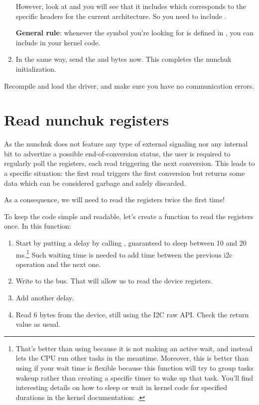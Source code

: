 \begin{enumerate}
      However, look at  and you will see
      that it includes  which corresponds to the
      specific headers for the current architecture. So you need to include
      .

      {\bf General rule}: whenever the symbol you're looking
      for is defined in , you
      can include  in your kernel code.

\item In the same way, send the  and  bytes now.
      This completes the nunchuk initialization.
\end{enumerate}

Recompile and load the driver, and make sure you have no communication
errors.

\section{Read nunchuk registers}

As the nunchuk does not feature any type of external signaling nor any
internal bit to advertize a possible end-of-conversion status, the user
is required to regularly poll the registers, each read triggering the
next conversion. This leads to a specific situation: the first read
triggers the first conversion but returns some data which can be
considered garbage and safely discarded.

As a consequence, we will need to read the registers twice the first time!

To keep the code simple and readable, let's create a
 function to read the registers once.
In this function:

\begin{enumerate}
\item Start by putting a  delay by calling
      , guaranteed to sleep between 10 and 20
      ms.\footnote{That's better than using  because it is not making
      an active wait, and instead lets the CPU run other tasks in the meantime.
      Moreover, this is better than using  if your wait time is
      flexible because this function will try to group tasks wakeup rather than
      creating a specific timer to wake up that task.
      You'll find interesting details on how to sleep or wait in kernel
      code for specified durations in the kernel documentation:
      .}
      Such waiting time is needed to add time between the previous i2c
      operation and the next one.
\item Write  to the bus. That will allow us to read
      the device registers.
\item Add another  delay.
\item Read 6 bytes from the device, still using the I2C raw API.
      Check the return value as usual.
\end{enumerate}

